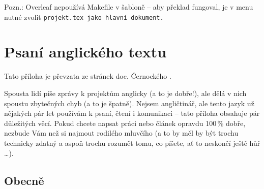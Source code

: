 Pozn.: Overleaf nepoužívá Makefile v šabloně -- aby překlad fungoval, je v menu nutné zvolit \tt projekt.tex \rm jako hlavní dokument.

\chapter{Psaní anglického textu}
\label{anglicky}
Tato příloha je převzata ze stránek doc. Černockého \cite{CernockyEnglish}.

Spousta lidí píše zprávy k projektům anglicky (a to je dobře!), ale dělá v nich spoustu zbytečných chyb (a to je špatně). Nejsem angličtinář, ale tento jazyk už nějakých pár let používám k psaní, čtení i komunikaci -- tato příloha obsahuje pár důležitých věcí. Pokud chcete napsat práci nebo článek opravdu 100\,\% dobře, nezbude Vám než si najmout rodilého mluvčího (a to by měl by být trochu technicky zdatný a aspoň trochu rozumět tomu, co píšete, ať to neskončí ještě hůř \ldots).

\section{Obecně}

